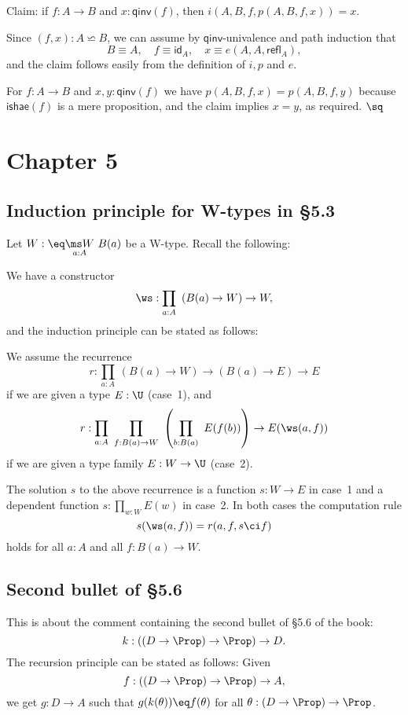 \documentclass[12pt]{article}
\begin{document}
Claim: if $f:A\to B$ and $x:\mathsf{qinv}(f)$, then $i(A,B,f,p(A,B,f,x))=x$.
 
Since $(f,x):A\backsimeq B$, we can assume by $\mathsf{qinv}$-univalence and path induction that 
$$
B\equiv A,\quad f\equiv\mathsf{id}_A,\quad x\equiv e(A,A,\mathsf{refl}_A),
$$ 
and the claim follows easily from the definition of $i,p$ and $e$.

For $f:A\to B$ and $x,y:\mathsf{qinv}(f)$ we have $p(A,B,f,x)=p(A,B,f,y)$ because $\mathsf{ishae}(f)$ is a mere proposition, and the claim implies $x=y$, as required. $\sq$


\section{Chapter 5}

\subsection{Induction principle for W-types in \S5.3}%

Let $W:\eq\underset{a:A}{\ms W}\ B(a)$ be a W-type. Recall the following: 

We have a constructor 
$$
\ws:\prod_{a:A}\ \left(B(a)\to W\right)\to W, 
$$ 
and the induction principle can be stated as follows:

We assume the recurrence 
$$
r:\prod_{a:A}\ (B(a)\to W)\to(B(a)\to E)\to E
$$ 
if we are given a type $E:\U$ (case~1), and 
$$
r:\prod_{a:A}\ \prod_{f:B(a)\to W}\ \left(\prod_{b:B(a)}\ E(f(b))\right)\to E(\ws(a,f))
$$ 
if we are given a type family $E:W\to\U$ (case~2). 

The solution $s$ to the above recurrence is a function $s:W\to E$ in case~1 and a dependent function $s:\prod_{w:W}E(w)$ in case~2. In both cases the computation rule 
$$
s(\ws(a,f))=r(a,f,s\ci f)
$$ 
holds for all $a:A$ and all $f:B(a)\to W$.


\subsection{Second bullet of \S5.6}%

This is about the comment containing the second bullet of \S5.6 of the book:
$$
k:((D\to\Prop)\to\Prop)\to D.
$$ 
The recursion principle can be stated as follows: Given 
$$
f:((D\to\Prop)\to\Prop)\to A,
$$ 
we get $g:D\to A$ such that $g(k(\theta))\eq f(\theta)$ for all $\theta:(D\to\Prop)\to\Prop$.
\end{document}
